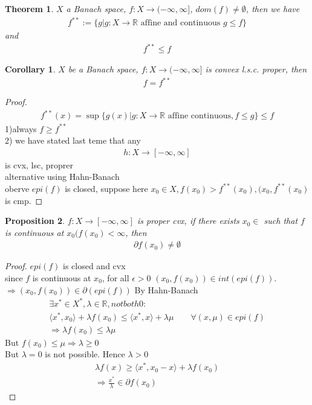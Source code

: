 \documentclass[a4paper,12pt,oneside,fleqn]{book}
\newtheorem{theorem}{Theorem}[section]
\newtheorem{corollary}{Corollary}[theorem]
\newtheorem{proposition}[theorem]{Proposition}
\theoremstyle{definition}
\theoremstyle{remark}
\begin{document}
\begin{theorem}
	$X$ a Banach space, $f: X \rightarrow (-\infty, \infty]$, $dom(f) \neq \emptyset$, then we have
	\begin{align*}
		f^{**}:= \{g| g: X \rightarrow \mathbb{R} \text{ affine and continuous } g \le f \}
	\end{align*}
	and 
	\begin{align*}
		f^{**} \le f
	\end{align*}
\end{theorem}


\begin{corollary}
	$X$ be a Banach space, $f: X \rightarrow (-\infty, \infty]$ is convex l.s.c. proper, then 
	\begin{align*}
		f = f^{**}
	\end{align*}
\end{corollary}
\begin{proof}
\begin{align*}
	f^{**}(x) = \sup\{g(x)|g:X \rightarrow \mathbb{R} \text{ affine continuous}, f \le g \} \le f	
\end{align*}
1)always $f \ge f^{**}$\\
2) we have stated last teme that any
\begin{align*}
	h:X \rightarrow [- \infty, \infty] 
\end{align*}
is cvx, lsc, proprer\\
alternative using Hahn-Banach \\
oberve $epi(f)$ is closed, suppose here $x_0 \in X, f(x_0) > f^{**}(x_0),(x_0, f^{**}(x_0)$ is cmp. 
\end{proof}

\begin{proposition}
	$f: X \rightarrow [-\infty, \infty]$ is proper cvx, if there exists $x_0 \in $ such that $f$ is continuous at $x_0(f(x_0) < \infty$, then 
	\begin{align*}
		\partial f(x_0) \neq \emptyset
	\end{align*}
\end{proposition}
\begin{proof}
	$epi(f)$ is closed and cvx\\
	since $f$ is continuous at $x_0$, for all $\epsilon > 0$ $(x_0, f(x_0))\in int(epi(f))$. \\
	$\Rightarrow (x_0, f(x_0)) \in \partial (epi(f)) $ 
	By Hahn-Banach
	\begin{align*}
		\exists x^* \in X^*, \lambda \in \mathbb{R}, notboth 0:\\
		\langle x^*, x_0 \rangle + \lambda f(x_0) \le \langle x^*, x\rangle + \lambda \mu \qquad \forall (x, \mu) \in epi(f) \\
		\Rightarrow \lambda f(x_0) \le \lambda \mu
	\end{align*}
	But $f(x_0) \le \mu \Rightarrow \lambda \geq 0$ \\
	But $\lambda = 0$ is not possible. Hence $\lambda >0$ 
	\begin{align*}
		\lambda f(x) \ge \langle x^*, x_0 - x \rangle + \lambda f(x_0)\\
		\Rightarrow \frac{x^*}{\lambda} \in \partial f(x_0)
	\end{align*}
\end{proof}
\end{document}
